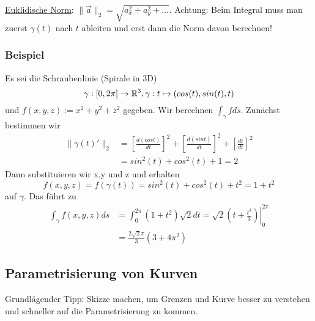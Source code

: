 \underline{Euklidische Norm}: $\|\vec{a}\|_2 = \sqrt{a_x^2 + a_y^2 + \ldots}$.
Achtung: Beim Integral muss man zuerst $\gamma(t)$ nach $t$ ableiten und erst
dann die Norm davon berechnen!

\subsubsection{Beispiel}
Es sei die Schraubenlinie (Spirale in 3D)
\[
\gamma : [0,2\pi]  \to \mathbb{R}^3, \gamma : t \mapsto  (cos(t), sin(t), t) 
\]
und $f(x,y,z) := x^2 + y^2 + z^2$ gegeben. Wir berechnen $\int_\gamma f ds$. Zunächst bestimmen wir
\begin{align*}
\|\gamma(t)'\|_2 &= \left[\frac{d(cos t)}{dt}\right]^2 + \left[\frac{d(sin t)}{dt}\right]^2 + \left[\frac{dt}{dt}\right]^2 \\
&=  sin^2(t)+cos^2(t)+1=2
\end{align*}
Dann substituieren wir x,y und z und erhalten
\[
f(x,y,z) = f(\gamma(t)) = sin^2(t)+cos^2(t)+t^2 = 1 +t^2
\]
auf $\gamma$. Das führt zu
\begin{align*}
\int_\gamma f(x,y,z) ds &= \int_0^{2\pi} (1 +t^2)\sqrt{2} dt = \left. \sqrt{2}(t+\frac{t^3}{3}) \right|_0^{2\pi} \\
&= \frac{2\sqrt{2}\pi}{3}(3+4\pi^2)
\end{align*}


\subsection{Parametrisierung von Kurven}
Grundlägender Tipp: Skizze machen, um Grenzen und Kurve besser zu verstehen und
schneller auf die Parametrisierung zu kommen.

